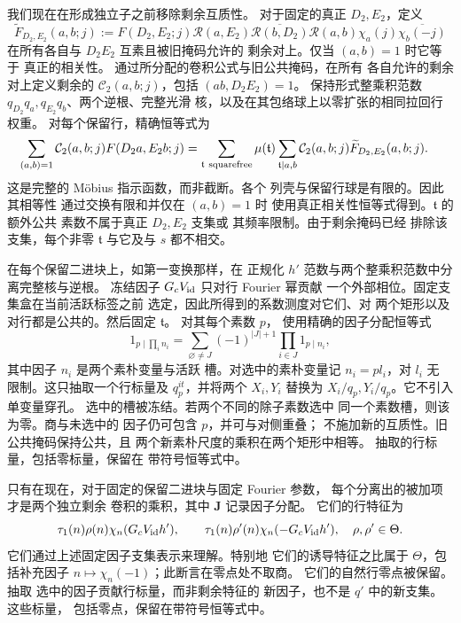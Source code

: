 \documentclass[11pt,a4paper]{article}
\numberwithin{equation}{section}
\numberwithin{figure}{section}
\theoremstyle{definition}
\theoremstyle{remark}
\begin{document}
我们现在在形成独立子之前移除剩余互质性。
对于固定的真正 \(D_2,E_2\)，定义
\[
 \widetilde F_{D_2,E_2}(a,b;j)
 :=F(D_2,E_2;j)\mathcal R(a,E_2)
   \overline{\mathcal R(b,D_2)}\mathcal R(a,b)
   \chi_a(j)\overline{\chi_b(-j)}
\]
在所有各自与 \(D_2E_2\) 互素且被旧掩码允许的
剩余对上。仅当 \((a,b)=1\) 时它等于
真正的相关性。
通过所分配的卷积公式与旧公共掩码，在所有
各自允许的剩余对上定义剩余的
\(\mathcal C_2(a,b;j)\)，包括 \((ab,D_2E_2)=1\)。
保持形式整乘积范数
\(q_{D_2}q_a,q_{E_2}q_b\)、两个逆根、完整光滑
核，以及在其包络球上以零扩张的相同拉回行权重。
对每个保留行，精确恒等式为
\[
 \begin{split}
 \sum_{(a,b)=1}\mathcal C_2(a,b;j)F(D_2a,E_2b;j)
 &=\sum_{\mathfrak t\ {\rm squarefree}}\mu(\mathfrak t)
   \sum_{\mathfrak t\mid a,b}\mathcal C_2(a,b;j)
                \widetilde F_{D_2,E_2}(a,b;j).
 \end{split}
\]
这是完整的 M\"obius 指示函数，而非截断。各个
列壳与保留行球是有限的。因此其相等性
通过交换有限和并仅在 \((a,b)=1\) 时
使用真正相关性恒等式得到。\(\mathfrak t\) 的额外公共
素数不属于真正 \(D_2,E_2\) 支集或
其频率限制。由于剩余掩码已经
排除该支集，每个非零 \(\mathfrak t\) 与它及与
\(s\) 都不相交。

在每个保留二进块上，如第一变换那样，在
正规化 \(h'\) 范数与两个整乘积范数中分离完整核与逆根。
冻结因子 \(G_cV_{\rm id}\) 只对行 Fourier 幂贡献
一个外部相位。固定支集盒在当前活跃标签之前
选定，因此所得到的系数测度对它们、对
两个矩形以及对行都是公共的。然后固定 \(\mathfrak t\)。
对其每个素数 \(p\)，
使用精确的因子分配恒等式
\[
 1_{p\mid\prod_i n_i}
 =\sum_{\varnothing\ne J}(-1)^{|J|+1}
       \prod_{i\in J}1_{p\mid n_i},
\]
其中因子 \(n_i\) 是两个素朴变量与活跃
槽。对选中的素朴变量记 \(n_i=pl_i\)，对 \(l_i\) 无
限制。这只抽取一个行标量及
\(q_p^{it}\)，并将两个 \(X_i,Y_i\) 替换为
\(X_i/q_p,Y_i/q_p\)。它不引入单变量穿孔。
选中的槽被冻结。若两个不同的除子素数选中
同一个素数槽，则该为零。商与未选中的
因子仍可包含 \(p\)，并可与对侧重叠；
不施加新的互质性。旧公共掩码保持公共，且
两个新素朴尺度的乘积在两个矩形中相等。
抽取的行标量，包括零标量，保留在
带符号恒等式中。

只有在现在，对于固定的保留二进块与固定 Fourier 参数，
每个分离出的被加项才是两个独立剩余
卷积的乘积，其中 \(\mathbf J\) 记录因子分配。
它们的行特征为
\[
 \tau_1(n)\rho(n)\chi_n(G_cV_{\rm id}h'),\qquad
 \tau_1(n)\rho'(n)\chi_n(-G_cV_{\rm id}h'),
 \quad \rho,\rho'\in\Theta.
\]
它们通过上述固定因子支集表示来理解。特别地
它们的诱导特征之比属于 \(\Theta\)，包括补充因子
\(n\mapsto\chi_n(-1)\)；此断言在零点处不取商。
它们的自然行零点被保留。抽取
选中的因子贡献行标量，而非剩余特征的
新因子，也不是 \(q'\) 中的新支集。这些标量，
包括零点，保留在带符号恒等式中。
\end{document}
